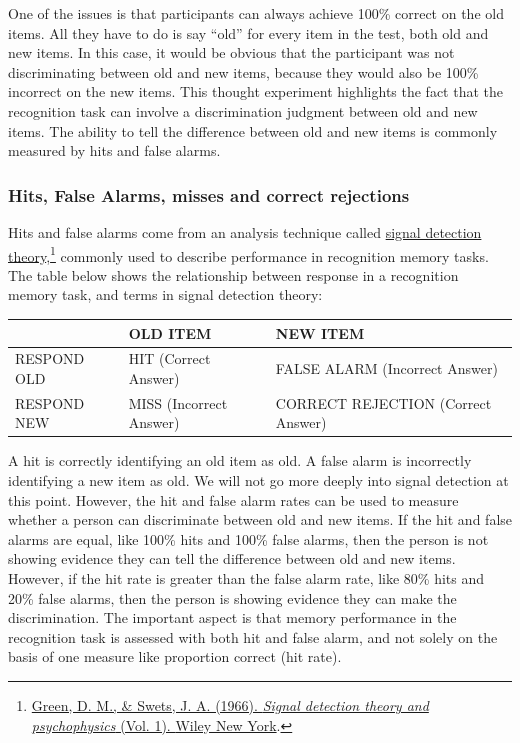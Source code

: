 \documentclass[
  oneside,
  12pt]{crumpbook}
\begin{document}
One of the issues is that participants can always achieve 100\% correct on the old items. All they have to do is say ``old'' for every item in the test, both old and new items. In this case, it would be obvious that the participant was not discriminating between old and new items, because they would also be 100\% incorrect on the new items. This thought experiment highlights the fact that the recognition task can involve a discrimination judgment between old and new items. The ability to tell the difference between old and new items is commonly measured by hits and false alarms.

\hypertarget{hits-false-alarms-misses-and-correct-rejections}{%
\subsubsection{Hits, False Alarms, misses and correct rejections}\label{hits-false-alarms-misses-and-correct-rejections}}

Hits and false alarms come from an analysis technique called \href{https://en.wikipedia.org/wiki/Detection_theory}{signal detection theory},\footnote{\protect\hyperlink{ref-greenSignalDetectionTheory1966}{Green, D. M., \& Swets, J. A. (1966). \emph{Signal detection theory and psychophysics} (Vol. 1). {Wiley New York}}.} commonly used to describe performance in recognition memory tasks. The table below shows the relationship between response in a recognition memory task, and terms in signal detection theory:

\begin{longtable}[]{@{}lll@{}}
\toprule
& OLD ITEM & NEW ITEM \\
\midrule
\endhead
RESPOND OLD & HIT (Correct Answer) & FALSE ALARM (Incorrect Answer) \\
RESPOND NEW & MISS (Incorrect Answer) & CORRECT REJECTION (Correct Answer) \\
\bottomrule
\end{longtable}

A hit is correctly identifying an old item as old. A false alarm is incorrectly identifying a new item as old. We will not go more deeply into signal detection at this point. However, the hit and false alarm rates can be used to measure whether a person can discriminate between old and new items. If the hit and false alarms are equal, like 100\% hits and 100\% false alarms, then the person is not showing evidence they can tell the difference between old and new items. However, if the hit rate is greater than the false alarm rate, like 80\% hits and 20\% false alarms, then the person is showing evidence they can make the discrimination. The important aspect is that memory performance in the recognition task is assessed with both hit and false alarm, and not solely on the basis of one measure like proportion correct (hit rate).
\end{document}
